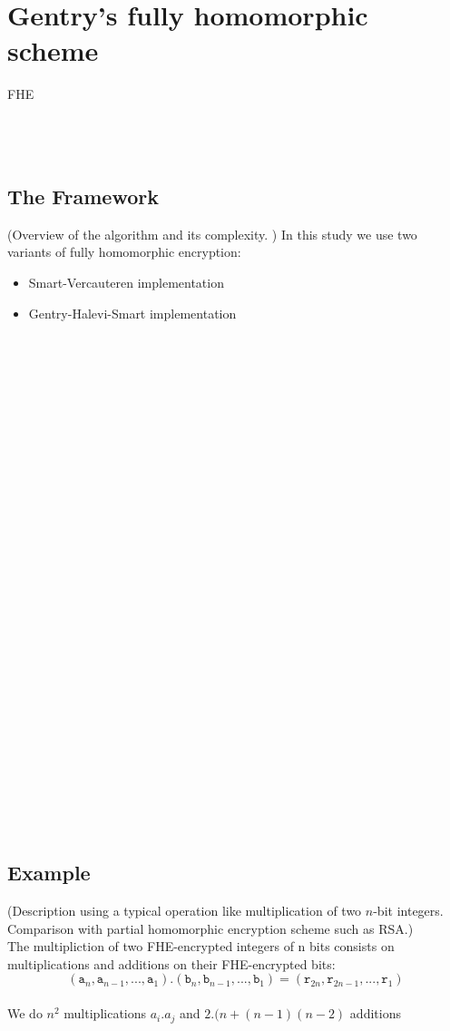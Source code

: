 \documentclass{acm_proc_article-sp}
\begin{document}
\section{Gentry's fully homomorphic scheme}
 FHE\\\\\\\
\subsection{The Framework}
(Overview of the algorithm and its complexity. )
In this study we use two variants of fully homomorphic encryption: 
\begin{itemize}
\item Smart-Vercauteren implementation


\item Gentry-Halevi-Smart implementation

\end{itemize}

 \\\\\\\\\\\\\\\\\\\\\\\\\\\\\\\\\\\\\\\\\\\\\\\\\\\\\\\\

\subsection{Example}
(Description using a typical operation like multiplication of two $n$-bit integers. Comparison with partial homomorphic encryption scheme such as RSA.)\\
The multipliction of two FHE-encrypted integers of n bits consists on multiplications and additions on their FHE-encrypted bits: \[(\texttt{a}_{n},\texttt{a}_{n-1}, ... ,\texttt{a}_{1}) . (\texttt{b}_{n},\texttt{b}_{n-1}, ... ,\texttt{b}_{1}) = (\texttt{r}_{2n},\texttt{r}_{2n-1}, ... ,\texttt{r}_{1})\] \\
We do $ n^{2}$ multiplications $ a_i.a_j$ and $ 2.(n + (n-1)(n-2)$ additions
\end{document}
